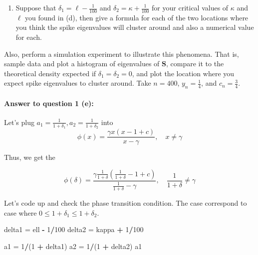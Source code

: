 \documentclass[
]{article}
\newenvironment{Shaded}{\begin{snugshade}}{\end{snugshade}}
\newcommand{\DecValTok}[1]{\textcolor[rgb]{0.00,0.00,0.81}{#1}}
\newcommand{\NormalTok}[1]{#1}
\newcommand{\OtherTok}[1]{\textcolor[rgb]{0.56,0.35,0.01}{#1}}
\newcommand{\SpecialCharTok}[1]{\textcolor[rgb]{0.81,0.36,0.00}{\textbf{#1}}}
\providecommand{\tightlist}{%
  \setlength{\itemsep}{0pt}\setlength{\parskip}{0pt}}
\begin{document}
\begin{enumerate}
\def\labelenumi{(\alph{enumi})}
\setcounter{enumi}{4}
\tightlist
\item
  Suppose that \(\delta_1 = \ell - \frac{1}{100}\) and
  \(\delta_2 = \kappa + \frac{1}{100}\) for your critical values of
  \(\kappa\) and \(\ell\) you found in (d), then give a formula for each
  of the two locations where you think the spike eigenvalues will
  cluster around and also a numerical value for each.
\end{enumerate}

Also, perform a simulation experiment to illustrate this phenomena. That
is, sample data and plot a histogram of eigenvalues of \(\mathbf{S}\),
compare it to the theoretical density expected if
\(\delta_1 = \delta_2 = 0\), and plot the location where you expect
spike eigenvalues to cluster around. Take \(n = 400\),
\(y_n = \frac{1}{4}\), and \(c_n = \frac{3}{4}\).

\paragraph{\texorpdfstring{\textbf{Answer to question 1
(e)}:}{Answer to question 1 (e):}}\label{answer-to-question-1-e}

Let's plug \(a_1 = \frac{1}{1 + \delta_1}, a_2 = \frac{1}{1+ \delta_2}\)
into \[
\phi(x) = \frac{\gamma x (x - 1 + c)}{x - \gamma}, \quad x \neq \gamma
\]

Thus, we get the

\[
\phi(\delta) = \frac{\gamma \frac{1}{1 + \delta} (\frac{1}{1 + \delta} - 1 + c)}{\frac{1}{1 + \delta} - \gamma}, \quad \frac{1}{1 + \delta} \neq \gamma
\]

Let's code up and check the phase transition condition. The case
correspond to case where \(0 \leq 1+\delta_1 \leq 1+\delta_2\).

\begin{Shaded}
\begin{Highlighting}[]
\NormalTok{delta1 }\OtherTok{=}\NormalTok{ ell }\SpecialCharTok{{-}} \DecValTok{1}\SpecialCharTok{/}\DecValTok{100}
\NormalTok{delta2 }\OtherTok{=}\NormalTok{ kappa }\SpecialCharTok{+} \DecValTok{1}\SpecialCharTok{/}\DecValTok{100}

\NormalTok{a1 }\OtherTok{=} \DecValTok{1}\SpecialCharTok{/}\NormalTok{(}\DecValTok{1} \SpecialCharTok{+}\NormalTok{ delta1)}
\NormalTok{a2 }\OtherTok{=} \DecValTok{1}\SpecialCharTok{/}\NormalTok{(}\DecValTok{1} \SpecialCharTok{+}\NormalTok{ delta2)}
\NormalTok{a1}
\end{Highlighting}
\end{Shaded}
\end{document}
